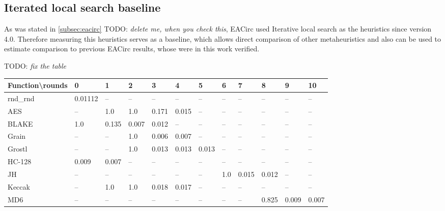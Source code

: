\documentclass[
  print, %
  Table,   %
  nolof,     %
  nolot,     %
  11pt, %
  oneside  %
]{fithesis3}
\newcommand{\todo}[1]{TODO: \textit{#1}}
\newcommand{\fd}{\cellcolor{red!13}}
\newcommand{\fn}{\cellcolor{green!13}}
\begin{document}
\subsection{Iterated local search baseline}
\label{subsec:res-ss-ils}

As was stated in \cref{subsec:eacirc} \todo{delete me, when you check this}, EACirc used Iterative local search as the heuristics since version 4.0. Therefore measuring this heuristics serves as a baseline, which allows direct comparison of other metaheuristics and also can be used to estimate comparison to previous EACirc results, whose were in this work verified.

\todo{fix the table}

\begin{table}[H]
\centering
\begin{tabular}{l|l l l l l l l l l l l}
Function\textbackslash{}rounds & 0 & 1 & 2 & 3 & 4 & 5 & 6 & 7 & 8 & 9 & 10\\ \hline
rnd\_rnd     & \fn{}0.01112 & --    & --    & --    & --    & --    & --    & --    & --    & --    & --   \\
AES          & \fd{}--    & \fd{}1.0   & \fd{}1.0   & \fd{}0.171 & \fn{}0.015 & \fn{}--    & \fn{}--    & \fn{}--    & \fn{}--    & \fn{}--    & \fn{}--   \\
BLAKE        & \fd{}1.0   & \fd{}0.135 & \fn{}0.007 & \fn{}0.012 & \fn{}--    & \fn{}--    & \fn{}--    & \fn{}--    & \fn{}--    & \fn{}--    & \fn{}--   \\
Grain        & \fd{}--    & \fd{}--    & \fd{}1.0   & \fn{}0.006 & \fn{}0.007 & \fn{}--    & \fn{}--    & \fn{}--    & \fn{}--    & \fn{}--    & \fn{}--   \\
Grostl       & \fd{}--    & \fd{}--    & \fd{}1.0   & \fn{}0.013 & \fn{}0.013 & \fn{}0.013 & \fn{}--    & \fn{}--    & \fn{}--    & \fn{}--    & \fn{}--   \\
HC-128       & \fn{}0.009 & \fn{}0.007 & \fn{}--    & \fn{}--    & \fn{}--    & \fn{}--    & \fn{}--    & \fn{}--    & \fn{}--    & \fn{}--    & \fn{}--   \\
JH           & \fd{}--    & \fd{}--    & \fd{}--    & \fd{}--    & \fd{}--    & \fd{}--    & \fd{}1.0   & \fn{}0.015 & \fn{}0.012 & \fn{}--    & \fn{}--   \\
Keccak       & \fd{}--    & \fd{}1.0   & \fd{}1.0   & \fn{}0.018 & \fn{}0.017 & \fn{}--    & \fn{}--    & \fn{}--    & \fn{}--    & \fn{}--    & \fn{}--   \\
MD6          & \fd{}--    & \fd{}--    & \fd{}--    & \fd{}--    & \fd{}--    & \fd{}--    & \fd{}--    & \fd{}--    & \fd{}0.825 & \fn{}0.009 & \fn{}0.007\\

\end{tabular}
\end{table}
\end{document}
